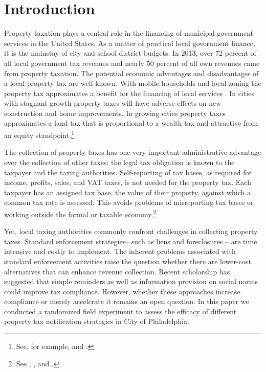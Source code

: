 \documentclass[12pt]{article}
\begin{document}
\newpage

\section{Introduction}

Property taxation plays a central role in the financing of municipal
government services in the United States. As a matter of practical
local government finance, it is the mainstay of city and school
district budgets.  In 2013, over 72 percent of all local government
tax revenues and nearly 50 percent of all own revenues came from
property taxation. The potential economic advantages and disadvantages
of a local property tax are well known.  With mobile households and
local zoning the property tax approximates a benefit for the financing
of local services \cite{Hamilton-75}.  In cities with stagnant growth
property taxes will have adverse effects on new construction and home
improvements.  In growing cities property taxes approximates a land
tax that is proportional to a wealth tax and attractive from an equity
standpoint.\footnote{See, for example,  and
  .}

The collection of property taxes has one very important administrative
advantage over the collection of other taxes: the legal tax obligation
is known to the taxpayer and the taxing authorities.  Self-reporting
of tax bases, as required for income, profits, sales, and VAT
taxes, is not needed for the property tax.  Each taxpayer has an
assigned tax base, the value of their property, against which a common tax
rate is assessed.  This avoids problems of misreporting tax bases or
working outside the formal or  taxable economy.\footnote{See
  , , and .}

Yet, local taxing authorities commonly confront challenges in
collecting property taxes.  Standard enforcement strategies-- such as
liens and foreclosures -- are time intensive and costly to implement.
The inherent problems associated with standard enforcement activities
raise the question whether there are lower-cost alternatives that can
enhance revenue collection. Recent scholarship has suggested that
simple reminders as well as information provision on social norms
could improve tax compliance\cite{delcarpio}. However, whether
these approaches increase compliance or merely accelerate it remains 
an open question.   In this paper we conducted a randomized
field experiment to assess the efficacy of different property tax
notification strategies in City of Philadelphia.
\end{document}
